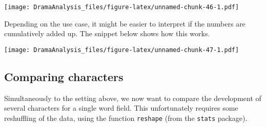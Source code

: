 \documentclass[]{book}
\newenvironment{Shaded}{\begin{snugshade}}{\end{snugshade}}
\newcommand{\CommentTok}[1]{\textcolor[rgb]{0.56,0.35,0.01}{\textit{#1}}}
\newcommand{\DataTypeTok}[1]{\textcolor[rgb]{0.13,0.29,0.53}{#1}}
\newcommand{\DecValTok}[1]{\textcolor[rgb]{0.00,0.00,0.81}{#1}}
\newcommand{\FloatTok}[1]{\textcolor[rgb]{0.00,0.00,0.81}{#1}}
\newcommand{\KeywordTok}[1]{\textcolor[rgb]{0.13,0.29,0.53}{\textbf{#1}}}
\newcommand{\NormalTok}[1]{#1}
\newcommand{\OperatorTok}[1]{\textcolor[rgb]{0.81,0.36,0.00}{\textbf{#1}}}
\newcommand{\OtherTok}[1]{\textcolor[rgb]{0.56,0.35,0.01}{#1}}
\newcommand{\StringTok}[1]{\textcolor[rgb]{0.31,0.60,0.02}{#1}}
\begin{document}
\texttt{[image: DramaAnalysis\_files/figure-latex/unnamed-chunk-46-1.pdf]}

Depending on the use case, it might be easier to interpret if the numbers are cumulatively added up. The snippet below shows how this works.

\begin{Shaded}
\end{Shaded}

\texttt{[image: DramaAnalysis\_files/figure-latex/unnamed-chunk-47-1.pdf]}

\hypertarget{comparing-characters}{%
\subsection{Comparing characters}\label{comparing-characters}}

Simultaneously to the setting above, we now want to compare the development of several characters for a single word field. This unfortunately requires some reshuffling of the data, using the function \texttt{reshape} (from the \texttt{stats} package).
\end{document}

